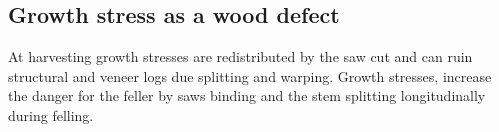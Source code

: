\subsection{Growth stress as a wood defect}

At harvesting growth stresses are redistributed by the saw cut
and can ruin structural and veneer logs due splitting and
warping. Growth stresses, increase the
danger for the feller by saws binding and the stem splitting longitudinally during felling.